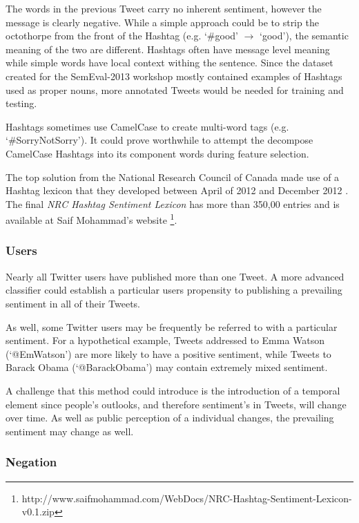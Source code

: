 \documentclass[final,3p,12pt]{elsarticle}
\begin{document}
The words in the previous Tweet carry no inherent sentiment, however the
message is clearly negative. While a simple approach could be to strip the
octothorpe from the front of the Hashtag (e.g. `\#good' $\rightarrow$ `good'),
the semantic meaning of the two are different. Hashtags often have message
level meaning while simple words have local context withing the sentence. Since
the dataset created for the SemEval-2013 workshop mostly contained examples of
Hashtags used as proper nouns, more annotated Tweets would be needed for
training and testing.

Hashtags sometimes use CamelCase to create multi-word tags (e.g.
`\#SorryNotSorry'). It could prove worthwhile to attempt the decompose
CamelCase Hashtags into its component words during feature selection.

The top solution from the National Research Council of Canada made use of a
Hashtag lexicon that they developed between April of 2012 and December 2012
\cite{Mohammad2013}. The final \textit{NRC Hashtag Sentiment Lexicon} has more
than 350,00 entries and is available at Saif Mohammad's website
\footnote{http://www.saifmohammad.com/WebDocs/NRC-Hashtag-Sentiment-Lexicon-v0.1.zip}.

\subsubsection{Users}
\label{sssection:users}

Nearly all Twitter users have published more than one Tweet. A more advanced
classifier could establish a particular users propensity to publishing a
prevailing sentiment in all of their Tweets.

As well, some Twitter users may be frequently be referred to with a particular
sentiment. For a hypothetical example, Tweets addressed to Emma Watson
(`@EmWatson') are more likely to have a positive sentiment, while Tweets to
Barack Obama (`@BarackObama') may contain extremely mixed sentiment.

A challenge that this method could introduce is the introduction of a temporal
element since people's outlooks, and therefore sentiment's in Tweets, will
change over time. As well as public perception of a individual changes, the
prevailing sentiment may change as well.

\subsubsection{Negation}
\label{sssection:negation}
\end{document}
